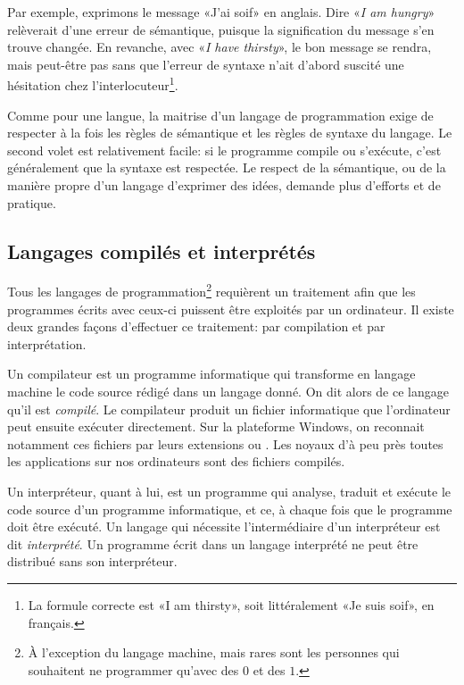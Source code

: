 Par exemple, exprimons le message «J'ai soif» en anglais. Dire
«\emph{I am hungry}» relèverait d'une erreur de sémantique, puisque la
signification du message s'en trouve changée. En revanche, avec
«\emph{I have thirsty}», le bon message se rendra, mais peut-être pas
sans que l'erreur de syntaxe n'ait d'abord suscité une hésitation chez
l'interlocuteur\footnote{%
  La formule correcte est «I am thirsty», soit littéralement «Je suis
  soif», en français.}.

Comme pour une langue, la maitrise d'un langage de programmation exige
de respecter à la fois les règles de sémantique et les règles de
syntaxe du langage. Le second volet est relativement facile: si le
programme compile ou s'exécute, c'est généralement que la syntaxe est
respectée. Le respect de la sémantique, ou de la manière propre d'un
langage d'exprimer des idées, demande plus d'efforts et de pratique.


\subsection{Langages compilés et interprétés}
\label{sec:informatique:programmer:compile_vs_interprete}

Tous les langages de programmation\footnote{%
  À l'exception du langage machine, mais rares sont les personnes qui
  souhaitent ne programmer qu'avec des $0$ et des $1$.} %
requièrent un traitement afin que les programmes écrits avec ceux-ci
puissent être exploités par un ordinateur. Il existe deux grandes
façons d'effectuer ce traitement: par compilation et par
interprétation.

Un compilateur est un programme informatique qui
transforme en langage machine le code source rédigé dans un langage
donné. On dit alors de ce langage qu'il est \emph{compilé}. Le compilateur produit un fichier
informatique que l'ordinateur peut ensuite exécuter directement. Sur
la plateforme Windows, on reconnait notamment ces fichiers par leurs
extensions  ou . Les noyaux d'à peu près toutes
les applications sur nos ordinateurs sont des fichiers compilés.

Un interpréteur, quant à lui, est un programme qui
analyse, traduit et exécute le code source d'un programme
informatique, et ce, à chaque fois que le programme doit être exécuté.
Un langage qui nécessite l'intermédiaire d'un interpréteur est dit
\emph{interprété}. Un programme écrit dans un langage interprété ne peut être distribué sans son
interpréteur.

